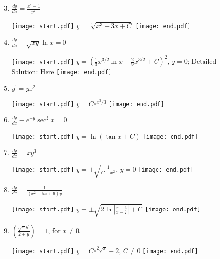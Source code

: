 \documentclass[12pt]{article}
\begin{document}
\medskip

\begin{enumerate}
\setcounter{enumi}{2}

\item $\frac{dy}{dx}=\frac{x^2-1}{y^2}$

\texttt{[image: start.pdf]}
{{$y=\sqrt[3]{x^3-3x+C}$}}
\texttt{[image: end.pdf]}


\item $\frac{dy}{dx}-\sqrt{xy}\ln{x}=0$

\texttt{[image: start.pdf]}
{{$y=\left(\frac{1}{3}x^{3/2}\ln{x}-\frac{2}{9}x^{3/2}+C\right)^2$, $y=0$; Detailed Solution: \textcolor{blue}{\href{http://www.math.drexel.edu/classes/Calculus/resources/Math123HW/Solutions/123_01_Separable_04.pdf}{Here}}}}
\texttt{[image: end.pdf]}


\item $y^{\prime}=yx^2$

\texttt{[image: start.pdf]}
{{$y=Ce^{x^3/3}$}}
\texttt{[image: end.pdf]}


\item $\frac{dy}{dx}-e^{-y}\sec^2{x}=0$

\texttt{[image: start.pdf]}
{{$y=\ln{(\tan{x}+C)}$}}
\texttt{[image: end.pdf]}


\item $\frac{dy}{dx}=xy^3$

\texttt{[image: start.pdf]}
{{$y=\pm\sqrt{\frac{1}{C-x^2}}$, $y=0$}}
\texttt{[image: end.pdf]}


\item $\frac{dy}{dx}=\frac{1}{(x^2-5x+6)y}$

\texttt{[image: start.pdf]}
{{$y=\pm\sqrt{2\ln{\left|\frac{x-3}{x-2}\right|}+C}$}}
\texttt{[image: end.pdf]}


\item $\left(\frac{\sqrt{x}y^\prime}{2+y}\right)=1$, for $x \neq 0$.  

\texttt{[image: start.pdf]}
{{$y=Ce^{2\sqrt{x}}-2$, $C \neq 0$}}
\texttt{[image: end.pdf]}


\end{enumerate}

\medskip


\medskip
\end{document}
